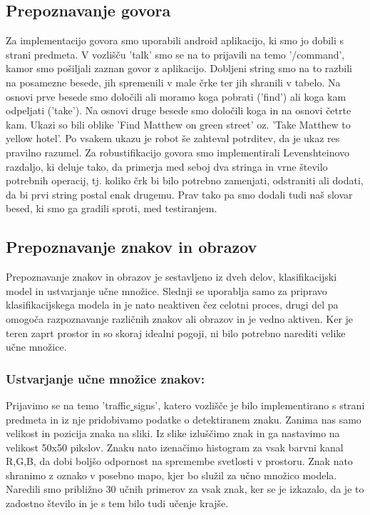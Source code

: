 \documentclass{llncs}
\begin{document}
\subsection{Prepoznavanje govora}
Za implementacijo govora smo uporabili android aplikacijo, ki smo jo dobili s strani predmeta. V vozlišču 'talk' smo se na to prijavili na temo '/command', kamor smo pošiljali zaznan govor z aplikacijo. Dobljeni string smo na to razbili na posamezne besede, jih spremenili v male črke ter jih shranili v tabelo. Na osnovi prve besede smo določili ali moramo koga pobrati ('find') ali koga kam odpeljati ('take'). Na osnovi druge besede smo določili koga in na osnovi četrte kam. Ukazi so bili oblike 'Find Matthew on green street' oz. 'Take Matthew to yellow hotel'. Po vsakem ukazu je robot še zahteval potrditev, da je ukaz res pravilno razumel.
Za robustifikacijo govora smo implementirali Levenshteinovo razdaljo, ki deluje tako, da primerja med seboj dva stringa in vrne število potrebnih operacij, tj. koliko črk bi bilo potrebno zamenjati, odstraniti ali dodati, da bi prvi string postal enak drugemu. Prav tako pa smo dodali tudi naš slovar besed, ki smo ga gradili sproti, med testiranjem.


\subsection{Prepoznavanje znakov in obrazov}
Prepoznavanje znakov in obrazov je sestavljeno iz dveh delov, klasifikacijski model in ustvarjanje učne množice. Slednji se uporablja samo za pripravo klasifikacijskega modela in je nato neaktiven čez celotni proces, drugi del pa omogoča razpoznavanje različnih znakov ali obrazov in je vedno aktiven. Ker je teren zaprt prostor in so skoraj idealni pogoji, ni bilo potrebno narediti velike učne množice. 

\subsubsection{Ustvarjanje učne množice znakov:} 

Prijavimo se na temo 'traffic\underline{ }signs', katero vozlišče je bilo implementirano s strani predmeta in iz nje pridobivamo podatke o detektiranem znaku. Zanima nas samo velikost in pozicija znaka na sliki. Iz slike izluščimo znak in ga nastavimo na velikost 50x50 pikslov. Znaku nato izenačimo histogram za vsak barvni kanal R,G,B, da dobi boljšo odpornost na spremembe svetlosti v prostoru. Znak nato shranimo z oznako v posebno mapo, kjer bo služil za učno množico modela. Naredili smo približno 30 učnih primerov za vsak znak, ker se je izkazalo, da je to zadostno število in je s tem bilo tudi učenje krajše. 
\end{document}
